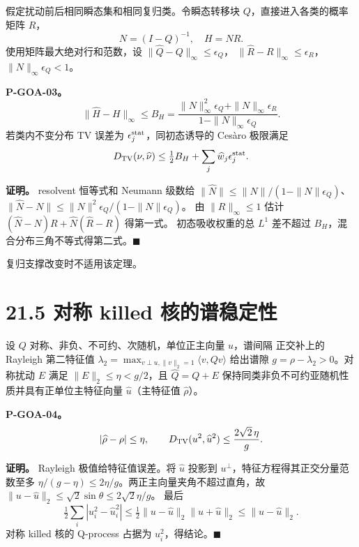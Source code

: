 \documentclass[
  11pt,
  oneside]{book}
\begin{document}
假定扰动前后相同瞬态集和相同复归类。令瞬态转移块 \(Q\)，直接进入各类的概率矩阵 \(R\)， \[N=(I-Q)^{-1},\quad H=NR.\] 使用矩阵最大绝对行和范数，设 \(\|\widehat Q-Q\|_\infty\le\epsilon_Q\)， \(\|\widehat R-R\|_\infty\le\epsilon_R\)， \(\|N\|_\infty\epsilon_Q<1\)。

\hypertarget{p-goa-03}{}\label{p-goa-03}

\textbf{P-GOA-03。} \[\|\widehat H-H\|_\infty\le
B_H=
\frac{\|N\|_\infty^2\epsilon_Q+
\|N\|_\infty\epsilon_R}
{1-\|N\|_\infty\epsilon_Q}.\] 若类内不变分布 TV 误差为 \(\epsilon_j^{\rm stat}\)，同初态诱导的 Cesàro 极限满足 \[D_{\rm TV}(\nu,\widehat\nu)
\le\tfrac12 B_H+\sum_j\widehat w_j\epsilon_j^{\rm stat}.\]

\textbf{证明。} resolvent 恒等式和 Neumann 级数给 \(\|\widehat N\|\le\|N\|/(1-\|N\|\epsilon_Q)\)、 \(\|\widehat N-N\|\le\|N\|^2\epsilon_Q/(1-\|N\|\epsilon_Q)\)。 由 \(\|R\|_\infty\le1\) 估计 \((\widehat N-N)R+\widehat N(\widehat R-R)\) 得第一式。 初态吸收权重的总 \(L^1\) 差不超过 \(B_H\)，混合分布三角不等式得第二式。\(\blacksquare\)

复归支撑改变时不适用该定理。

\section{21.5 对称 killed 核的谱稳定性}\label{ux5bf9ux79f0-killed-ux6838ux7684ux8c31ux7a33ux5b9aux6027}

设 \(Q\) 对称、非负、不可约、次随机，单位正主向量 \(u\)，谱间隔 正交补上的 Rayleigh 第二特征值 \(\lambda_2=\max_{v\perp u,\|v\|_2=1}\langle v,Qv\rangle\) 给出谱隙 \(g=\rho-\lambda_2>0\)。对称扰动 \(E\) 满足 \(\|E\|_2\le\eta<g/2\)，且 \(\widehat Q=Q+E\) 保持同类非负不可约亚随机性质并具有正单位主特征向量 \(\widehat u\)（主特征值 \(\widehat\rho\)）。

\hypertarget{p-goa-04}{}\label{p-goa-04}

\textbf{P-GOA-04。} \[|\widehat\rho-\rho|\le\eta,\qquad
D_{\rm TV}(u^2,\widehat u^2)\le\frac{2\sqrt2\,\eta}{g}.\]

\textbf{证明。} Rayleigh 极值给特征值误差。将 \(\widehat u\) 投影到 \(u^\perp\)，特征方程得其正交分量范数至多 \(\eta/(g-\eta)\le2\eta/g\)。两正主向量夹角不超过直角，故 \(\|u-\widehat u\|_2\le\sqrt2\sin\theta\le2\sqrt2\eta/g\)。 最后 \[\tfrac12\sum_i|u_i^2-\widehat u_i^2|
\le\tfrac12\|u-\widehat u\|_2\|u+\widehat u\|_2
\le\|u-\widehat u\|_2.\] 对称 killed 核的 Q-process 占据为 \(u_i^2\)，得结论。\(\blacksquare\)
\end{document}
